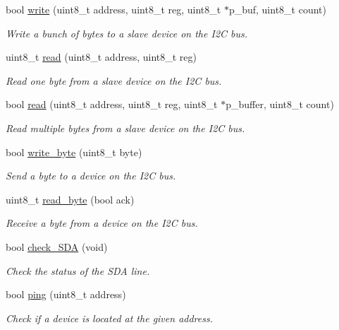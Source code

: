 \begin{DoxyCompactItemize}
bool \hyperlink{classi2c__master_af0fa22c49a5c72c53e8132930cd701e5}{write} (uint8\-\_\-t address, uint8\-\_\-t reg, uint8\-\_\-t $\ast$p\-\_\-buf, uint8\-\_\-t count)
\begin{DoxyCompactList}\small\item\em Write a bunch of bytes to a slave device on the I2\-C bus. \end{DoxyCompactList}\item 
uint8\-\_\-t \hyperlink{classi2c__master_a3e1513222d835e893e05009bd49038c1}{read} (uint8\-\_\-t address, uint8\-\_\-t reg)
\begin{DoxyCompactList}\small\item\em Read one byte from a slave device on the I2\-C bus. \end{DoxyCompactList}\item 
bool \hyperlink{classi2c__master_aebc041e481c0516a4c0fa7158c4f1fc0}{read} (uint8\-\_\-t address, uint8\-\_\-t reg, uint8\-\_\-t $\ast$p\-\_\-buffer, uint8\-\_\-t count)
\begin{DoxyCompactList}\small\item\em Read multiple bytes from a slave device on the I2\-C bus. \end{DoxyCompactList}\item 
bool \hyperlink{classi2c__master_aaf14a54e71e000366a963d1180aa9cfb}{write\-\_\-byte} (uint8\-\_\-t byte)
\begin{DoxyCompactList}\small\item\em Send a byte to a device on the I2\-C bus. \end{DoxyCompactList}\item 
uint8\-\_\-t \hyperlink{classi2c__master_aeec5f20ac4b77ff82811a44d6c9f0273}{read\-\_\-byte} (bool ack)
\begin{DoxyCompactList}\small\item\em Receive a byte from a device on the I2\-C bus. \end{DoxyCompactList}\item 
bool \hyperlink{classi2c__master_a45f502f0e44b3eecea3f9069b5039295}{check\-\_\-\-S\-D\-A} (void)
\begin{DoxyCompactList}\small\item\em Check the status of the S\-D\-A line. \end{DoxyCompactList}\item 
bool \hyperlink{classi2c__master_a336d8879f371ebcba91d2a83509d517f}{ping} (uint8\-\_\-t address)
\begin{DoxyCompactList}\small\item\em Check if a device is located at the given address. \end{DoxyCompactList}\item 

\end{DoxyCompactItemize}
